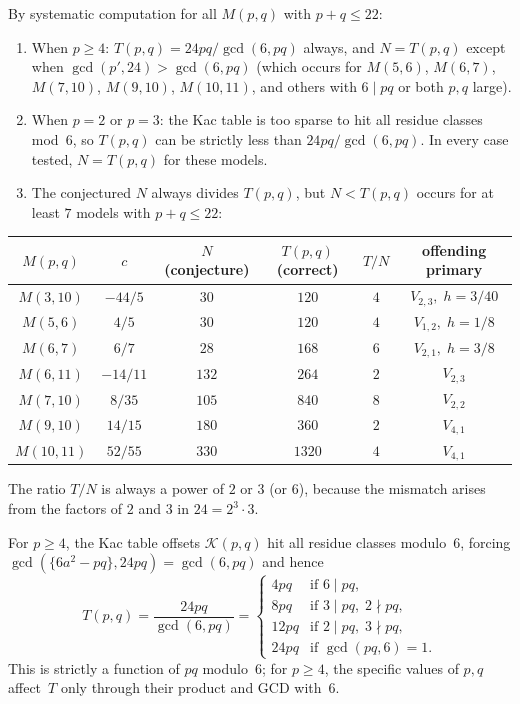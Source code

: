 \documentclass[11pt]{article}
\begin{document}
\begin{computation}
\label{comp:T-order-vs-N}
By systematic computation for all $M(p,q)$ with $p + q \le 22$:
\begin{enumerate}[label=\textup{(\roman*)}]
\item When $p \ge 4$: $T(p,q) = 24pq/\gcd(6, pq)$ always,
  and $N = T(p,q)$ except when $\gcd(p',24) > \gcd(6,pq)$
  (which occurs for $M(5,6)$, $M(6,7)$, $M(7,10)$,
  $M(9,10)$, $M(10,11)$, and others with
  $6 \mid pq$ or both $p,q$ large).
\item When $p = 2$ or $p = 3$: the Kac table is too sparse
  to hit all residue classes mod~$6$, so $T(p,q)$ can be
  strictly less than $24pq/\gcd(6,pq)$.  In every case
  tested, $N = T(p,q)$ for these models.
\item The conjectured $N$ always divides $T(p,q)$, but
  $N < T(p,q)$ occurs for at least $7$ models with
  $p + q \le 22$:
\end{enumerate}
\begin{center}
\small
\renewcommand{\arraystretch}{1.15}
\begin{tabular}{cccccc}
$M(p,q)$ & $c$ & $N$ (conjecture) & $T(p,q)$ (correct) &
  $T/N$ & offending primary \\
\hline
$M(3,10)$ & $-44/5$ & $30$ & $120$ & $4$ & $V_{2,3},\; h = 3/40$ \\
$M(5,6)$ & $4/5$ & $30$ & $120$ & $4$ & $V_{1,2},\; h = 1/8$ \\
$M(6,7)$ & $6/7$ & $28$ & $168$ & $6$ & $V_{2,1},\; h = 3/8$ \\
$M(6,11)$ & $-14/11$ & $132$ & $264$ & $2$ & $V_{2,3}$ \\
$M(7,10)$ & $8/35$ & $105$ & $840$ & $8$ & $V_{2,2}$ \\
$M(9,10)$ & $14/15$ & $180$ & $360$ & $2$ & $V_{4,1}$ \\
$M(10,11)$ & $52/55$ & $330$ & $1320$ & $4$ & $V_{4,1}$
\end{tabular}
\end{center}
The ratio $T/N$ is always a power of $2$ or $3$ (or $6$),
because the mismatch arises from the factors of $2$ and $3$
in $24 = 2^3 \cdot 3$.
\end{computation}

\begin{remark}
\label{rem:stable-formula}
For $p \ge 4$, the Kac table offsets $\mathcal{K}(p,q)$
hit all residue classes modulo~$6$, forcing
$\gcd(\{6a^2 - pq\}, 24pq) = \gcd(6,pq)$ and hence
\[
T(p,q) = \frac{24pq}{\gcd(6, pq)}
= \begin{cases}
4pq & \text{if } 6 \mid pq, \\
8pq & \text{if } 3 \mid pq,\; 2 \nmid pq, \\
12pq & \text{if } 2 \mid pq,\; 3 \nmid pq, \\
24pq & \text{if } \gcd(pq,6) = 1.
\end{cases}
\]
This is strictly a function of $pq$ modulo~$6$; for $p \ge 4$,
the specific values of $p, q$ affect~$T$ only through their
product and GCD with~$6$.
\end{remark}
\end{document}
